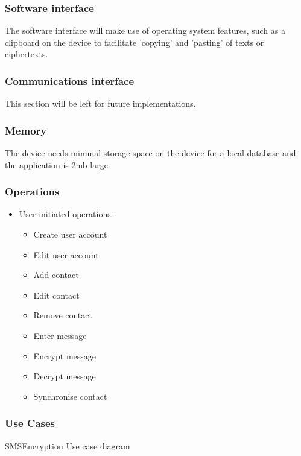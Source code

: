\subsubsection{Software interface}
 The software interface will make use of operating system features, such as a clipboard on the device to facilitate 'copying' and 'pasting' of texts or ciphertexts.
\subsubsection{Communications interface}
This section will be left for future implementations.
\subsubsection{Memory}
The device needs minimal storage space on the device for a local database and the application is 2mb large.
\subsubsection{Operations}
\begin{itemize}
\item User-initiated operations:
\begin{itemize}
\item Create user account
\item Edit user account
\item Add contact
\item Edit contact
\item Remove contact
\item Enter message
\item Encrypt message
\item Decrypt message
\item Synchronise contact
\end{itemize}
\end{itemize}


\subsubsection{Use Cases}
SMSEncryption Use case diagram

